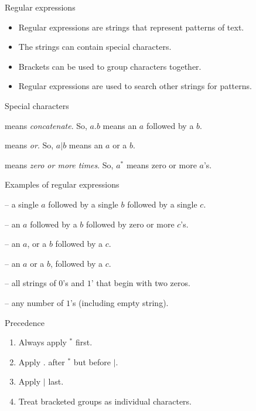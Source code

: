 \begin{frame}{Regular expressions}
  

  \begin{itemize}
    \item Regular expressions are strings that represent patterns of text.
    \item The strings can contain special characters.
    \item Brackets can be used to group characters together.
    \item Regular expressions are used to search other strings for patterns.
  \end{itemize}
  \begin{alertblock}{Special characters}
    \begin{description}[abbb]
      \item[$.$] means \emph{concatenate}. So, $a.b$ means an $a$ followed by a $b$.
      \item[$|$] means \emph{or}. So, $a|b$ means an $a$ or a $b$.
      \item[$*$] means \emph{zero or more times}. So, $a^*$ means zero or more $a$'s.
    \end{description}
  \end{alertblock}
\end{frame}

\begin{frame}{Examples of regular expressions}
  \begin{description}[aaaaaaaa]
    \setlength\itemsep{5mm}
    \item[$a.b.c$] -- a single $a$ followed by a single $b$ followed by a single $c$. 
    \item[$a.b.c^*$] -- an $a$ followed by a $b$ followed by zero or more $c$'s.
    \item[$a|b.c$] -- an $a$, or a $b$ followed by a $c$.
    \item[$(a|b).c$] -- an $a$ or a $b$, followed by a $c$.
    \item[$0.0.(0|1)^*$] -- all strings of $0$'s and $1$' that begin with two zeros.
    \item[$1^*$] -- any number of $1$'s (including empty string).
  \end{description}
\end{frame}


\begin{frame}{Precedence}
  \begin{enumerate}
    \setlength\itemsep{5mm}
    \item Always apply $^*$ first.
    \item Apply $.$ after $^*$ but before $|$.
    \item Apply $|$ last.
    \item Treat bracketed groups as individual characters.
  \end{enumerate}
\end{frame}


